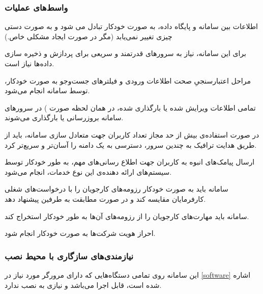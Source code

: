 \documentclass[12pt,svgnames,oneside]{book}
\newcounter{itemadded}
\let\LaTeXStandardEnumerateBegin\enumerate
\let\LaTeXStandardEnumerateEnd\endenumerate
\renewenvironment{enumerate}{%
\LaTeXStandardEnumerateBegin%
\setcounter{itemadded}{0}
}{%
\LaTeXStandardEnumerateEnd%
}%
\begin{document}
\subsubsection{واسط‌های عملیات}
\begin{enumerate}
\item
اطلاعات بین سامانه و پایگاه داده، به صورت خودکار تبادل می شود و به صورت دستی چیزی تغییر نمی‌یابد (مگر در صورت ایجاد مشکلی خاص.)
\item
برای این سامانه، نیاز به سرورهای قدرتمند و سریعی برای پردازش و ذخیره سازی داده‌ها نیاز است.
\item
مراحل اعتبارسنجیِ صحت اطلاعات ورودی و فیلترهای جست‌و‌جو به صورت خودکار، توسط سامانه انجام می‌شود.
\item
تمامی اطلاعات ویرایش شده یا بارگذاری شده، در همان لحظه
 صورت  )	 در سرور‌های سامانه بروزرسانی یا بارگذاری می‌شوند.
\item
در صورت استفاده‌ی بیش از حد مجاز تعداد کاربران جهت متعادل سازی سامانه، باید از طریق هدایت ترافیک به چندین سرور، دسترسی به یک دامنه را آسان‌تر و سریع‌تر کرد.
\item
ارسال پیامک‌های انبوه به کاربران جهت اطلاع رسانی‌های مهم، به طور خودکار توسط سیستم‌های ارائه دهنده‌ی این نوع خدمات، انجام می‌شود.
\item
سامانه باید به صورت خودکار رزومه‌های کارجویان را با درخواست‌های شغلی کارفرمایان مقایسه کند و در صورت مطابقت به طرفین پیشنهاد دهد.
\item
سامانه باید مهارت‌های کارجویان را از رزومه‌های آن‌ها به طور خودکار استخراج کند.
\item
احراز هویت شرکت‌ها به صورت خودکار انجام شود.
\end{enumerate}

\subsubsection{نیازمندی‌های سازگاری با محیط نصب}
این سامانه روی تمامی دستگاه‌هایی که دارای مرورگر مورد نیاز در \ref{software} اشاره شده است، قابل اجرا می‌باشد و نیازی به نصب ندارد.
\end{document}

